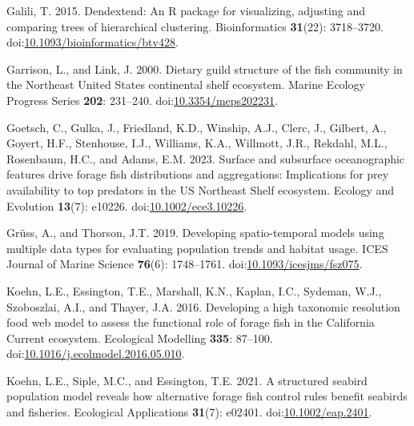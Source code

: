 \documentclass[
]{article}
\newlength{\cslhangindent}
\newlength{\cslentryspacingunit} %
\newenvironment{CSLReferences}[2] %
 {%
  \setlength{\parindent}{0pt}
  \ifodd #1
  \let\oldpar\par
  \def\par{\hangindent=\cslhangindent\oldpar}
  \fi
  \setlength{\parskip}{#2\cslentryspacingunit}
 }%
 {}
\begin{document}
\begin{CSLReferences}{1}{0}
\leavevmode{}%
Galili, T. 2015. Dendextend: An {R} package for visualizing, adjusting and comparing trees of hierarchical clustering. Bioinformatics \textbf{31}(22): 3718--3720. doi:\href{https://doi.org/10.1093/bioinformatics/btv428}{10.1093/bioinformatics/btv428}.

\leavevmode{}%
Garrison, L., and Link, J. 2000. Dietary guild structure of the fish community in the {Northeast} {United} {States} continental shelf ecosystem. Marine Ecology Progress Series \textbf{202}: 231--240. doi:\href{https://doi.org/10.3354/meps202231}{10.3354/meps202231}.

\leavevmode{}%
Goetsch, C., Gulka, J., Friedland, K.D., Winship, A.J., Clerc, J., Gilbert, A., Goyert, H.F., Stenhouse, I.J., Williams, K.A., Willmott, J.R., Rekdahl, M.L., Rosenbaum, H.C., and Adams, E.M. 2023. Surface and subsurface oceanographic features drive forage fish distributions and aggregations: {Implications} for prey availability to top predators in the {US} {Northeast} {Shelf} ecosystem. Ecology and Evolution \textbf{13}(7): e10226. doi:\href{https://doi.org/10.1002/ece3.10226}{10.1002/ece3.10226}.

\leavevmode{}%
Grüss, A., and Thorson, J.T. 2019. Developing spatio-temporal models using multiple data types for evaluating population trends and habitat usage. ICES Journal of Marine Science \textbf{76}(6): 1748--1761. doi:\href{https://doi.org/10.1093/icesjms/fsz075}{10.1093/icesjms/fsz075}.

\leavevmode{}%
Koehn, L.E., Essington, T.E., Marshall, K.N., Kaplan, I.C., Sydeman, W.J., Szoboszlai, A.I., and Thayer, J.A. 2016. Developing a high taxonomic resolution food web model to assess the functional role of forage fish in the {California} {Current} ecosystem. Ecological Modelling \textbf{335}: 87--100. doi:\href{https://doi.org/10.1016/j.ecolmodel.2016.05.010}{10.1016/j.ecolmodel.2016.05.010}.

\leavevmode{}%
Koehn, L.E., Siple, M.C., and Essington, T.E. 2021. A structured seabird population model reveals how alternative forage fish control rules benefit seabirds and fisheries. Ecological Applications \textbf{31}(7): e02401. doi:\href{https://doi.org/10.1002/eap.2401}{10.1002/eap.2401}.


\end{CSLReferences}
\end{document}
